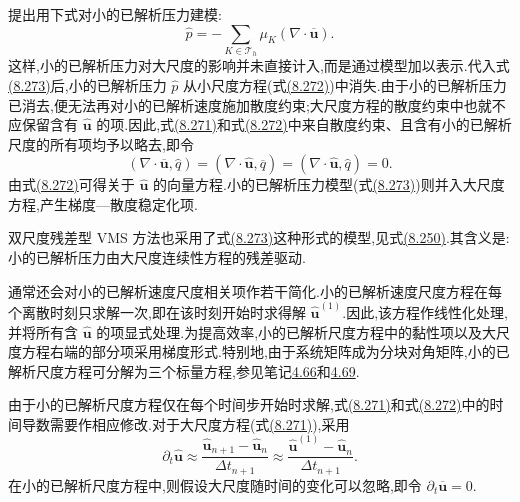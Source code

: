 \begin{note}[小的已解析压力的建模]
\label{note:vms-bubble-pressure-model}\label{note:vms-grad-div-second}
\textcite{GravemeierWallRamm2004,GravemeierWallRamm2005} 提出用下式对小的已解析压力建模:
\begin{equation}\label{eq:vms-bubble-pressure-model}
 \widehat p=-\sum_{K\in\mathcal T_h}\mu_K(\nabla\cdot\overline{\bm u}).
\end{equation}
这样,小的已解析压力对大尺度的影响并未直接计入,而是通过模型加以表示.代入式\hyperref[eq:vms-bubble-pressure-model]{(8.273)}后,小的已解析压力 $\widehat p$ 从小尺度方程(式\hyperref[eq:vms-bubble-small-scale-splitting]{(8.272)})中消失.由于小的已解析压力已消去,便无法再对小的已解析速度施加散度约束;大尺度方程的散度约束中也就不应保留含有 $\widehat{\bm u}$ 的项.因此,式\hyperref[eq:vms-bubble-large-scale-splitting]{(8.271)}和式\hyperref[eq:vms-bubble-small-scale-splitting]{(8.272)}中来自散度约束、且含有小的已解析尺度的所有项均予以略去,即令
\begin{equation}\label{eq:vms-bubble-divergence-terms}
 (\nabla\cdot\overline{\bm u},\widehat q)
 =(\nabla\cdot\widehat{\bm u},\overline q)
 =(\nabla\cdot\widehat{\bm u},\widehat q)=0.
\end{equation}
由式\hyperref[eq:vms-bubble-small-scale-splitting]{(8.272)}可得关于 $\widehat{\bm u}$ 的向量方程.小的已解析压力模型(式\hyperref[eq:vms-bubble-pressure-model]{(8.273)})则并入大尺度方程,产生梯度—散度稳定化项.

双尺度残差型 VMS 方法也采用了式\hyperref[eq:vms-bubble-pressure-model]{(8.273)}这种形式的模型,见式\hyperref[eq:vms-algebraic-unresolved-model]{(8.250)}.其含义是:小的已解析压力由大尺度连续性方程的残差驱动.
\end{note}

\begin{note}[进一步简化]
\label{note:vms-bubble-further-simplifications}
通常还会对小的已解析速度尺度相关项作若干简化.小的已解析速度尺度方程在每个离散时刻只求解一次,即在该时刻开始时求得解 $\widehat{\bm u}^{(1)}$.因此,该方程作线性化处理,并将所有含 $\widehat{\bm u}$ 的项显式处理.为提高效率,小的已解析尺度方程中的黏性项以及大尺度方程右端的部分项采用梯度形式.特别地,由于系统矩阵成为分块对角矩阵,小的已解析尺度方程可分解为三个标量方程,参见笔记\hyperref[note:stokes-algebraic-saddle-point]{4.66}和\hyperref[note:stokes-deformation-tensor-implementation]{4.69}.

由于小的已解析尺度方程仅在每个时间步开始时求解,式\hyperref[eq:vms-bubble-large-scale-splitting]{(8.271)}和式\hyperref[eq:vms-bubble-small-scale-splitting]{(8.272)}中的时间导数需要作相应修改.对于大尺度方程(式\hyperref[eq:vms-bubble-large-scale-splitting]{(8.271)}),采用
\[
 \partial_t\widehat{\bm u}\approx
 \frac{\widehat{\bm u}_{n+1}-\widehat{\bm u}_n}{\Delta t_{n+1}}
 \approx\frac{\widehat{\bm u}^{(1)}-\widehat{\bm u}_n}
 {\Delta t_{n+1}}.
\]
在小的已解析尺度方程中,则假设大尺度随时间的变化可以忽略,即令 $\partial_t\overline{\bm u}=0$.
\end{note}

